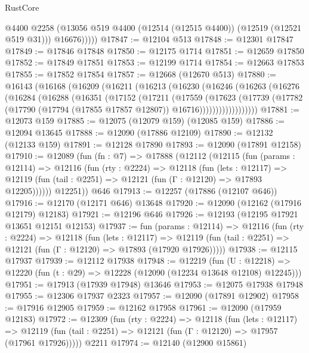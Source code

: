 \begin{lexlean}{RustCore}
\begin{coremodule}
              @4400
              @2258
              (@13056 @519 @4400 (@12514 (@12515 @4400)) (@12519 (@12521 @519 @31)))
              @16676)))))
@17847 := @12104 @513
@17848 := @12301 @17847
@17849 := @17846 @17848
@17850 := @12175 @1714
@17851 := @12659 @17850
@17852 := @17849 @17851
@17853 := @12199 @1714
@17854 := @12663 @17853
@17855 := @17852 @17854
@17857 := @12668 (@12670 @513)
@17880 := @16143
    (@16168
      (@16209
        (@16211
          (@16213
            (@16230
              (@16246
                (@16263
                  (@16276
                    (@16284
                      (@16288
                        (@16351
                          (@17152
                            (@17211
                              (@17559
                                (@17623
                                  (@17739
                                    (@17782
                                      (@17790
                                        (@17794 (@17855 @17857 @12807))
                                        @16716))))))))))))))))))
@17881 := @12073 @159
@17885 := @12075 (@12079 @159) (@12085 @159)
@17886 := @12094 @13645
@17888 := @12090 (@17886 @12109)
@17890 := @12132 (@12133 @159)
@17891 := @12128 @17890
@17893 := @12090 (@17891 @12158)
@17910 := @12089
    (fun (fn : @7) =>
    @17888
      (@12112
        (@12115
          (fun (params : @12114) =>
          @12116
            (fun (rty : @2224) =>
            @12118
              (fun (lets : @12117) =>
              @12119 (fun (tail : @2251) => @12121 (fun (Γ : @12120) => @17893 @12205))))))
        @12251))
    @646
@17913 := @12257 (@17886 (@12107 @646))
@17916 := @12170 (@12171 @646) @13648
@17920 := @12090 (@12162 (@17916 @12179) @12183)
@17921 := @12196 @646
@17926 := @12193 (@12195 @17921 @13651 @12151 @12153)
@17937 := fun (params : @12114) =>
  @12116
    (fun (rty : @2224) =>
    @12118
      (fun (lets : @12117) =>
      @12119 (fun (tail : @2251) => @12121 (fun (Γ : @12120) => @17893 (@17920 @17926)))))
@17938 := @12115 @17937
@17939 := @12112 @17938
@17948 := @12219
    (fun (U : @12218) => @12220 (fun (t : @29) => @12228 (@12090 (@12234 @13648 @12108) @12245)))
@17951 := @17913 (@17939 @17948) @13646
@17953 := @12075 @17938 @17948
@17955 := @12306 @17937 @2323
@17957 := @12090 (@17891 @12902)
@17958 := @17916 @12905
@17959 := @12162 @17958
@17961 := @12090 (@17959 @12183)
@17972 := @12309
    (fun (rty : @2224) =>
    @12118
      (fun (lets : @12117) =>
      @12119 (fun (tail : @2251) => @12121 (fun (Γ : @12120) => @17957 (@17961 @17926)))))
    @2211
@17974 := @12140 (@12900 @15861)

\end{coremodule}
\end{lexlean}
